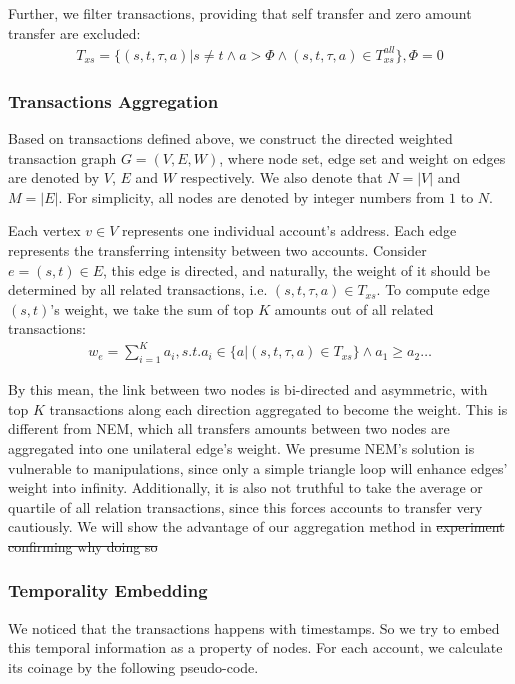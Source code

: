 Further, we filter transactions, providing that self transfer and zero amount transfer are excluded:
\begin{align}
	T_{xs} = \{(s,t,\tau, a)| s \neq t \land a > \Phi \land (s,t,\tau, a) \in T_{xs}^{all} \}, \Phi = 0
\end{align}

\subsubsection{Transactions Aggregation} \label{subsec:aggreate}
 Based on transactions defined above, we construct the directed weighted transaction graph $G=(V, E, W)$, where node set, edge set and weight on edges are denoted by $V$, $E$ and $W$ respectively. We also denote that $N = |V|$ and $M = |E|$. For simplicity, all nodes are denoted by integer numbers from $1$ to $N$.

Each vertex $v \in V$ represents one individual account's address. Each edge represents the transferring intensity between two accounts. Consider $e=(s,t) \in E$, this edge is directed, and naturally, the weight of it should be determined by all related transactions, i.e. $(s,t,\tau, a) \in T_{xs}$. To compute edge $(s,t)$'s weight, we take the sum of top $K$ amounts out of all related transactions:
\begin{align}\label{formula:edgeweight}
w_e = \sum_{i=1}^K a_i, s.t. a_i \in \{a|(s,t,\tau,a) \in T_{xs} \} \land a_1 \geq a_2 \dots
\end{align}

By this mean, the link between two nodes is bi-directed and asymmetric, with top $K$ transactions along each direction aggregated to become the weight. This is different from NEM, which all transfers amounts between two nodes are aggregated into one unilateral edge's weight\cite{nem}. We presume NEM's solution is vulnerable to manipulations, since only a simple triangle loop will enhance edges' weight into infinity. Additionally, it is also not truthful to take the average or quartile of all relation transactions, since this forces accounts to transfer very cautiously. We will show the advantage of our aggregation method in  \st{experiment confirming why doing so}

\subsubsection{Temporality Embedding} \label{subsec:coinage}
We noticed that the transactions happens with timestamps. So we try to embed this temporal information as a property of nodes. For each account, we calculate its coinage by the following pseudo-code.

